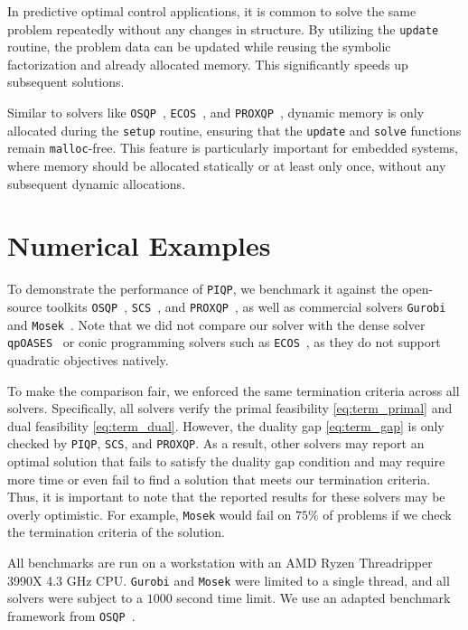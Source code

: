 \documentclass[letterpaper, 10 pt, conference]{ieeeconf}  \IEEEoverridecommandlockouts
\begin{document}
In predictive optimal control applications, it is common to solve the same problem repeatedly without any changes in structure. By utilizing the \texttt{update} routine, the problem data can be updated while reusing the symbolic factorization and already allocated memory. This significantly speeds up subsequent solutions.

Similar to solvers like \texttt{OSQP}~\cite{stellato2020}, \texttt{ECOS}~\cite{domahidi2013}, and \texttt{PROXQP}~\cite{bambade2022}, dynamic memory is only allocated during the \texttt{setup} routine, ensuring that the \texttt{update} and \texttt{solve} functions remain \texttt{malloc}-free. This feature is particularly important for embedded systems, where memory should be allocated statically or at least only once, without any subsequent dynamic allocations.

\section{Numerical Examples}
\label{sec:num}

To demonstrate the performance of \texttt{PIQP}, we benchmark it against the open-source toolkits \texttt{OSQP}~\cite{stellato2020}, \texttt{SCS}~\cite{donoghue2016}, and \texttt{PROXQP}~\cite{bambade2022}, as well as commercial solvers \texttt{Gurobi}~\cite{gurobi} and \texttt{Mosek}~\cite{mosek}. Note that we did not compare our solver with the dense solver \texttt{qpOASES}~\cite{ferreau2014qpoases} or conic programming solvers such as \texttt{ECOS}~\cite{domahidi2013}, as they do not support quadratic objectives natively.

To make the comparison fair, we enforced the same termination criteria across all solvers. Specifically, all solvers verify the primal feasibility \eqref{eq:term_primal} and dual feasibility \eqref{eq:term_dual}. However, the duality gap \eqref{eq:term_gap} is only checked by \texttt{PIQP}, \texttt{SCS}, and \texttt{PROXQP}. As a result, other solvers may report an optimal solution that fails to satisfy the duality gap condition and may require more time or even fail to find a solution that meets our termination criteria. Thus, it is important to note that the reported results for these solvers may be overly optimistic. For example, \texttt{Mosek} would fail on $75 \%$ of problems if we check the termination criteria of the solution.

All benchmarks are run on a workstation with an AMD Ryzen
Threadripper 3990X 4.3 GHz CPU. \texttt{Gurobi} and \texttt{Mosek} were limited to a single thread, and all solvers were subject to a $1000$ second time limit. We use an adapted benchmark framework from \texttt{OSQP}~\cite{stellato2020}.
\end{document}
